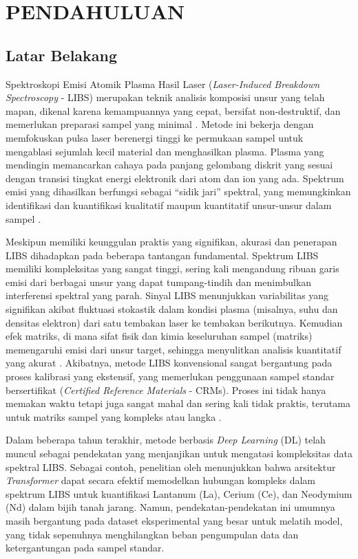 \chapter{PENDAHULUAN}

\section{Latar Belakang}

Spektroskopi Emisi Atomik Plasma Hasil Laser (\textit{Laser-Induced Breakdown Spectroscopy} - LIBS) merupakan teknik analisis komposisi unsur yang telah mapan, dikenal karena kemampuannya yang cepat, bersifat non-destruktif, dan memerlukan preparasi sampel yang minimal \parencite{Thorne1999, Cremers2013}. Metode ini bekerja dengan memfokuskan pulsa laser berenergi tinggi ke permukaan sampel untuk mengablasi sejumlah kecil material dan menghasilkan plasma. Plasma yang mendingin memancarkan cahaya pada panjang gelombang diskrit yang sesuai dengan transisi tingkat energi elektronik dari atom dan ion yang ada. Spektrum emisi yang dihasilkan berfungsi sebagai ``sidik jari'' spektral, yang memungkinkan identifikasi dan kuantifikasi kualitatif maupun kuantitatif unsur-unsur dalam sampel \parencite{Harmon2021}.

Meskipun memiliki keunggulan praktis yang signifikan, akurasi dan penerapan LIBS dihadapkan pada beberapa tantangan fundamental. Spektrum LIBS memiliki kompleksitas yang sangat tinggi, sering kali mengandung ribuan garis emisi dari berbagai unsur yang dapat tumpang-tindih dan menimbulkan interferensi spektral yang parah. Sinyal LIBS menunjukkan variabilitas yang signifikan akibat fluktuasi stokastik dalam kondisi plasma (misalnya, suhu dan densitas elektron) dari satu tembakan laser ke tembakan berikutnya. Kemudian efek matriks, di mana sifat fisik dan kimia keseluruhan sampel (matriks) memengaruhi emisi dari unsur target, sehingga menyulitkan analisis kuantitatif yang akurat \parencite{Gaudiuso2023}. Akibatnya, metode LIBS konvensional sangat bergantung pada proses kalibrasi yang ekstensif, yang memerlukan penggunaan sampel standar bersertifikat (\textit{Certified Reference Materials} - CRMs). Proses ini tidak hanya memakan waktu tetapi juga sangat mahal dan sering kali tidak praktis, terutama untuk matriks sampel yang kompleks atau langka \parencite{Porizka2018}.

Dalam beberapa tahun terakhir, metode berbasis \textit{Deep Learning} (DL) telah muncul sebagai pendekatan yang menjanjikan untuk mengatasi kompleksitas data spektral LIBS. Sebagai contoh, penelitian oleh \textcite{Yang2025} menunjukkan bahwa arsitektur \textit{Transformer} dapat secara efektif memodelkan hubungan kompleks dalam spektrum LIBS untuk kuantifikasi Lantanum (La), Cerium (Ce), dan Neodymium (Nd) dalam bijih tanah jarang. Namun, pendekatan-pendekatan ini umumnya masih bergantung pada dataset eksperimental yang besar untuk melatih model, yang tidak sepenuhnya menghilangkan beban pengumpulan data dan ketergantungan pada sampel standar.

